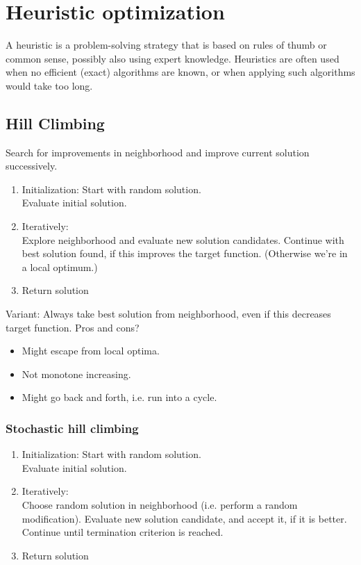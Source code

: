 \section{Heuristic optimization}

A heuristic is a problem-solving strategy that is based on rules
of thumb or common sense, possibly also using expert
knowledge. Heuristics are often used when no efficient (exact) algorithms
are known, or when applying such algorithms would take too
long.

\subsection{Hill Climbing}
Search for improvements in neighborhood and improve current solution successively.

\begin{enumerate}
    \item Initialization: Start with random solution. \\
    Evaluate initial solution.
    \item Iteratively: \\
    Explore neighborhood and evaluate new solution candidates. Continue with best solution found, if this improves the target function. (Otherwise we’re in a local optimum.)
    \item Return solution
\end{enumerate}

\begin{tcolorbox}[colback=red!5!white,colframe=red!75!black]
Variant: Always take best solution from neighborhood, even if this decreases target function. Pros and cons?
\begin{itemize}
    \item Might escape from local optima.
    \item Not monotone increasing.
    \item Might go back and forth, i.e. run into a cycle.
\end{itemize}
\end{tcolorbox}

\subsubsection{Stochastic hill climbing}

\begin{enumerate}
    \item Initialization: Start with random solution. \\
    Evaluate initial solution.
    \item Iteratively: \\
    Choose random solution in neighborhood (i.e. perform a
random modification). Evaluate new solution candidate,
and accept it, if it is better. Continue until termination
criterion is reached.
    \item Return solution
\end{enumerate}

